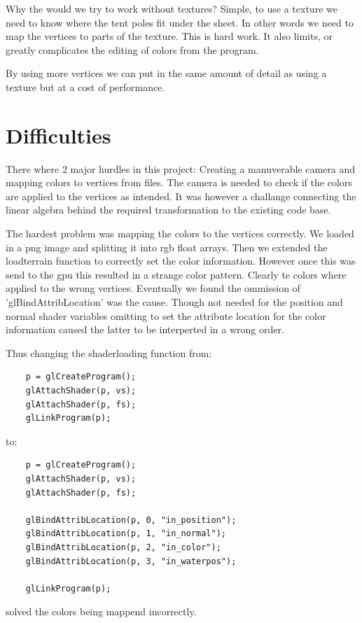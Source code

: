 \documentclass[a4paper, 11pt]{article} %
\begin{document}
Why the would we try to work without textures? Simple, to use a texture we need to know where the tent poles fit under the sheet. In other words we need to map the vertices to parts of the texture. This is hard work. It also limits, or greatly complicates the editing of colors from the program.

By using more vertices we can put in the same amount of detail as using a texture but at a cost of performance.

\section*{Difficulties}

There where 2 major hurdles in this project: Creating a manuverable camera and mapping colors to vertices from files. The camera is needed to check if the colors are applied to the vertices as intended. It was however a challange connecting the linear algebra behind the required transformation to the existing code base.

The hardest problem was mapping the colors to the vertices correctly. We loaded in a png image and splitting it into rgb float arrays. Then we extended the loadterrain function to correctly set the color information. However once this was send to the gpu this resulted in a strange color pattern. Clearly te colors where applied to the wrong vertices. Eventually we found the ommission of 'glBindAttribLocation' was the cause. Though not needed for the position and normal shader variables omitting to set the attribute location for the color information caused the latter to be interperted in a wrong order.

Thus changing the shaderloading function from:
\begin{lstlisting}
	p = glCreateProgram();
	glAttachShader(p, vs);
	glAttachShader(p, fs);
	glLinkProgram(p);
\end{lstlisting}

to:
\begin{lstlisting}
	p = glCreateProgram();
	glAttachShader(p, vs);
	glAttachShader(p, fs);

	glBindAttribLocation(p, 0, "in_position");
	glBindAttribLocation(p, 1, "in_normal");
	glBindAttribLocation(p, 2, "in_color");
	glBindAttribLocation(p, 3, "in_waterpos");

	glLinkProgram(p);
\end{lstlisting}
solved the colors being mappend incorrectly.
\end{document}
